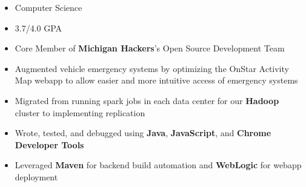 \documentclass[10pt,a4paper,ragged2e]{altacv}
\begin{document}
\tagline{}

\begin{fullwidth}
\makecvheader
\end{fullwidth}



\begin{itemize}
    \item Computer Science
    \smallskip
    \item 3.7/4.0 GPA
    \smallskip
    \item Core Member of \textbf{Michigan Hackers}'s Open Source Development Team
\end{itemize}



\begin{itemize}
\item Augmented vehicle emergency systems by optimizing the OnStar Activity Map webapp to allow easier and more intuitive access of emergency systems
\smallskip
\item Migrated from running spark jobs in each data center for our \textbf{Hadoop} cluster to implementing replication
\smallskip
\item Wrote, tested, and debugged using \textbf{Java}, \textbf{JavaScript}, and \textbf{Chrome Developer Tools}
\smallskip
\item Leveraged \textbf{Maven} for backend build automation and \textbf{WebLogic} for webapp deployment
\end{itemize}
\end{document}
